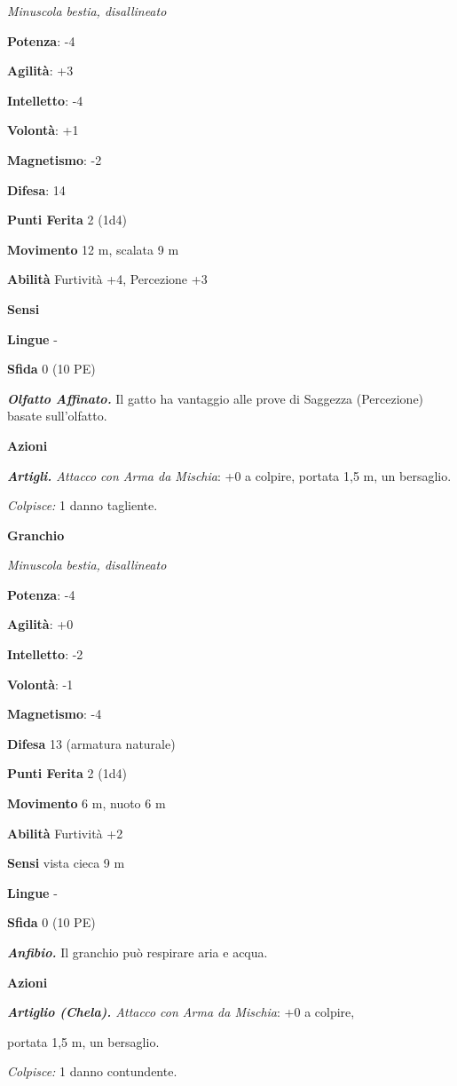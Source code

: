 \begin{multicols}{2}
\emph{Minuscola bestia, disallineato}

\textbf{Potenza}: -4

\textbf{Agilità}: +3

\textbf{Intelletto}: -4

\textbf{Volontà}: +1

\textbf{Magnetismo}: -2

\textbf{Difesa}: 14

\textbf{Punti Ferita} 2 (1d4)

\textbf{Movimento} 12 m, scalata 9 m

\textbf{Abilità} Furtività +4, Percezione +3

\textbf{Sensi} 

\textbf{Lingue} -

\textbf{Sfida} 0 (10 PE)

\emph{\textbf{Olfatto Affinato.}} Il gatto ha vantaggio alle prove di
Saggezza (Percezione) basate sull'olfatto.

\textbf{Azioni}

\emph{\textbf{Artigli.} Attacco con Arma da Mischia}: +0 a colpire,
portata 1,5 m, un bersaglio.

\emph{Colpisce:} 1 danno tagliente.

\textbf{Granchio}

\emph{Minuscola bestia, disallineato}

\textbf{Potenza}: -4

\textbf{Agilità}: +0

\textbf{Intelletto}: -2

\textbf{Volontà}: -1

\textbf{Magnetismo}: -4

\textbf{Difesa} 13 (armatura naturale)

\textbf{Punti Ferita} 2 (1d4)

\textbf{Movimento} 6 m, nuoto 6 m

\textbf{Abilità} Furtività +2

\textbf{Sensi} vista cieca 9 m

\textbf{Lingue} -

\textbf{Sfida} 0 (10 PE)

\emph{\textbf{Anfibio.}} Il granchio può respirare aria e acqua.

\textbf{Azioni}

\emph{\textbf{Artiglio (Chela).} Attacco con Arma da Mischia}: +0 a
colpire,

portata 1,5 m, un bersaglio.

\emph{Colpisce:} 1 danno contundente.


\end{multicols}
